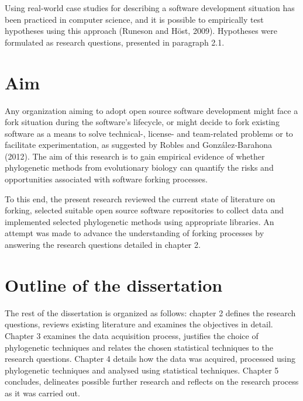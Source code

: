 Using real-world case studies for describing a software development situation has been practiced in computer science, and it is possible to empirically test hypotheses using this approach (Runeson and Höst, 2009). Hypotheses were formulated as research questions, presented in paragraph 2.1.


\section{Aim}
Any organization aiming to adopt open source software development might face a fork situation during the software's lifecycle, or might decide to fork existing software as a means to solve technical-, license- and team-related problems or to facilitate experimentation, as suggested by Robles and González-Barahona (2012). The aim of this research is to gain empirical evidence of whether phylogenetic methods from evolutionary biology can quantify the risks and opportunities associated with software forking processes.

To this end, the present research reviewed the current state of literature on forking, selected suitable open source software repositories to collect data and implemented selected phylogenetic methods using appropriate libraries. An attempt was made to advance the understanding of forking processes by answering the research questions detailed in chapter 2.


\section{Outline of the dissertation}
The rest of the dissertation is organized as follows: chapter 2 defines the research questions, reviews existing literature and examines the objectives in detail. Chapter 3 examines the data acquisition process, justifies the choice of phylogenetic techniques and relates the chosen statistical techniques to the research questions. Chapter 4 details how the data was acquired, processed using phylogenetic techniques and analysed using statistical techniques. Chapter 5 concludes, delineates possible further research and reflects on the research process as it was carried out.